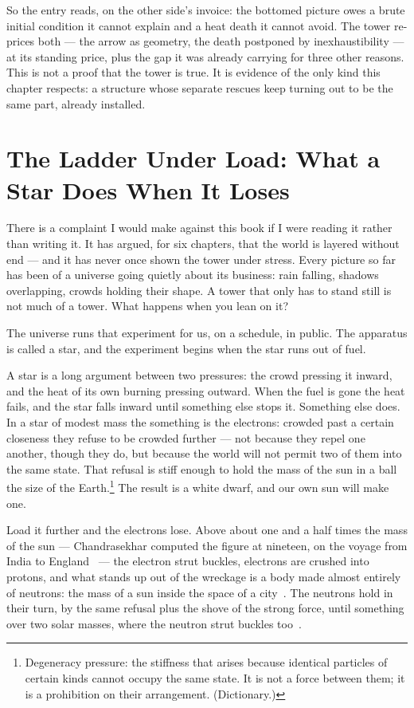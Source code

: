 \documentclass[fontsize=11pt,paper=a4,pagesize=auto,parskip=half-]{scrbook}
\begin{document}
So the entry reads, on the other side's invoice: the bottomed picture owes a brute initial condition it cannot explain and a heat death it cannot avoid. The tower re-prices both --- the arrow as geometry, the death postponed by inexhaustibility --- at its standing price, plus the gap it was already carrying for three other reasons. This is not a proof that the tower is true. It is evidence of the only kind this chapter respects: a structure whose separate rescues keep turning out to be the same part, already installed.


\section{The Ladder Under Load: What a Star Does When It Loses}

There is a complaint I would make against this book if I were reading it rather than writing it. It has argued, for six chapters, that the world is layered without end --- and it has never once shown the tower under stress. Every picture so far has been of a universe going quietly about its business: rain falling, shadows overlapping, crowds holding their shape. A tower that only has to stand still is not much of a tower. What happens when you lean on it?

The universe runs that experiment for us, on a schedule, in public. The apparatus is called a star, and the experiment begins when the star runs out of fuel.

A star is a long argument between two pressures: the crowd pressing it inward, and the heat of its own burning pressing outward. When the fuel is gone the heat fails, and the star falls inward until something else stops it. Something else does. In a star of modest mass the something is the electrons: crowded past a certain closeness they refuse to be crowded further --- not because they repel one another, though they do, but because the world will not permit two of them into the same state. That refusal is stiff enough to hold the mass of the sun in a ball the size of the Earth.\footnote{Degeneracy pressure: the stiffness that arises because identical particles of certain kinds cannot occupy the same state. It is not a force between them; it is a prohibition on their arrangement. (Dictionary.)} The result is a white dwarf, and our own sun will make one.

Load it further and the electrons lose. Above about one and a half times the mass of the sun --- Chandrasekhar computed the figure at nineteen, on the voyage from India to England~\cite{chandrasekhar1931} --- the electron strut buckles, electrons are crushed into protons, and what stands up out of the wreckage is a body made almost entirely of neutrons: the mass of a sun inside the space of a city~\cite{baadezwicky1934cr}. The neutrons hold in their turn, by the same refusal plus the shove of the strong force, until something over two solar masses, where the neutron strut buckles too~\cite{oppenheimervolkoff1939,ligo2017}.
\end{document}
